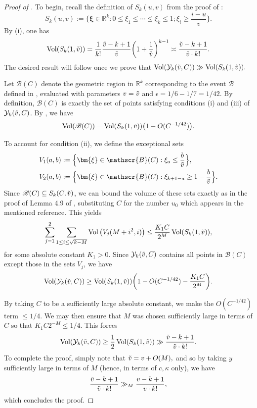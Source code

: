 \documentclass{amsart}
\theoremstyle{definition}
\numberwithin{equation}{section}
\newcommand{\R}{\mathbb{R}}
\DeclareMathOperator{\Vol}{Vol}
\begin{document}
	\begin{proof}[Proof of ]
		To begin, recall the definition of $S_k(u,v)$ from the proof of :
		$$S_k(u,v) := \Big\{\bm{\xi} \in \mathbb{R}^k : 0 \leq \xi_1 \leq \cdots \leq \xi_k \leq 1 ; \xi_i \geq \frac{i-u}{v}\Big\}.$$
		By  (i), one has
		\begin{equation}\label{apply wool thm Sk}
			\Vol(S_k(1,\Tilde{v})) = \frac{1}{k!} \frac{\Tilde{v}-k+1}{\Tilde{v}}\bigg(1+\frac{1}{\Tilde{v}}\bigg)^{k-1} \asymp \frac{\Tilde{v}-k+1}{\Tilde{v} \cdot k!}.
		\end{equation}
		The desired result will follow once we prove that $\Vol(\mathcal{Y}_k(\Tilde{v},C)) \gg \Vol(S_k(1,\Tilde{v})).$ 
		
		Let $\mathscr{B}(C)$ denote the geometric region in $\R^k$ corresponding to the event $\mathscr{B}$ defined in , evaluated with parameters $v = \Tilde{v}$ and $\epsilon = 1/6 - 1/7 = 1/42$. By definition, $\mathscr{B}(C)$ is exactly the set of points satisfying conditions (i) and (iii) of $\mathcal{Y}_k(\Tilde{v},C)$. By , we have 
		\begin{equation} \label{ihatethis3}
			\Vol(\mathscr{B}(C)) = \Vol(S_k(1,\Tilde{v})) \big(1 - O(C^{-1/42})\big).
		\end{equation}
		
		To account for condition (ii), we define the exceptional sets
		\begin{align*}
			V_1(a,b) &:= \Big\{\bm{\xi} \in \mathscr{B}(C) : \xi_a \leq \frac{b}{\Tilde{v}}\Big\}, \\
			V_2(a,b) &:=  \Big\{\bm{\xi} \in \mathscr{B}(C) : \xi_{k+1-a} \geq 1-\frac{b}{\Tilde{v}}\Big\}.
		\end{align*}
		Since $\mathscr{B}(C) \subseteq S_k(C, \Tilde{v})$, we can bound the volume of these sets exactly as in the proof of Lemma 4.9 of \cite{ford2008distribution}, substituting $C$ for the number $u_0$ which appears in the mentioned reference. This yields
		\begin{equation}
			\label{ihatethis2} \sum_{j = 1}^2 \sum_{1 \leq i \leq \sqrt{k-M}} \Vol\big(V_j(M+i^2,i)\big) \leq \frac{K_1 C}{2^M} \Vol(S_k(1,\Tilde{v})),
		\end{equation}
		for some absolute constant $K_1 > 0$. Since $\mathcal{Y}_k(\Tilde{v},C)$ contains all points in $\mathscr{B}(C)$ except those in the sets $V_j$, we have
		$$\Vol(\mathcal{Y}_k(\Tilde{v},C)) \geq \Vol(S_k(1,\Tilde{v})) \bigg(1 - O(C^{-1/42}) - \frac{K_1 C}{2^M}\bigg).$$
		
		By taking $C$ to be a sufficiently large absolute constant, we make the $O(C^{-1/42})$ term $\leq 1/4$. We may then ensure that $M$ was chosen sufficiently large in terms of $C$ so that $K_1 C 2^{-M} \leq 1/4$. This forces
		$$\Vol(\mathcal{Y}_k(\Tilde{v},C)) \geq \frac{1}{2}\Vol(S_k(1,\Tilde{v})) \gg \frac{\Tilde{v}-k+1}{\Tilde{v} \cdot k!}.$$
		To complete the proof, simply note that $\Tilde{v} = v +O(M),$ and so by taking $y$ sufficiently large in terms of $M$ (hence, in terms of $c,\kappa$ only), we have
		$$\frac{\Tilde{v}-k+1}{\Tilde{v} \cdot k!} \gg_M \frac{v-k+1}{v \cdot k!},$$
		which concludes the proof.
	\end{proof}
\end{document}
